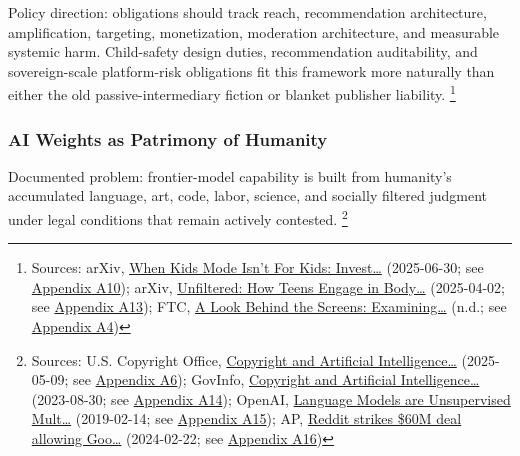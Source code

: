 \documentclass[
  american,
  11pt,
  letterpaper,
]{article}
\begin{document}
Policy direction: obligations should track reach, recommendation
architecture, amplification, targeting, monetization, moderation
architecture, and measurable systemic harm. Child-safety design duties,
recommendation auditability, and sovereign-scale platform-risk
obligations fit this framework more naturally than either the old
passive-intermediary fiction or blanket publisher liability. \footnote{Sources:
  arXiv, \href{https://arxiv.org/abs/2507.00299}{When Kids Mode Isn't
  For Kids: Invest\ldots{}} (2025-06-30; see
  \hyperref[ch-10-appendix-a10-when-kids-mode-isn-t-for-kids-investigating-tiktok-s-under-13-experience]{Appendix
  A10}); arXiv, \href{https://arxiv.org/abs/2504.02176}{Unfiltered: How
  Teens Engage in Body\ldots{}} (2025-04-02; see
  \hyperref[ch-10-appendix-a13-unfiltered-how-teens-engage-in-body-image-and-shaming-discussions-via-instagram-direct-messages-dms]{Appendix
  A13}); FTC,
  \href{https://www.ftc.gov/reports/look-behind-screens-examining-data-practices-social-media-video-streaming-services}{A
  Look Behind the Screens: Examining\ldots{}} (n.d.; see
  \hyperref[ch-10-appendix-a4-a-look-behind-the-screens-examining-the-data-practices-of-social-media-and-video-streaming-services]{Appendix
  A4})}

\subsubsection{AI Weights as Patrimony of
Humanity}\label{ai-weights-as-patrimony-of-humanity}

Documented problem: frontier-model capability is built from humanity's
accumulated language, art, code, labor, science, and socially filtered
judgment under legal conditions that remain actively contested.
\footnote{Sources: U.S. Copyright Office,
  \href{https://copyright.gov/ai/Copyright-and-Artificial-Intelligence-Part-3-Generative-AI-Training-Report-Pre-Publication-Version.pdf}{Copyright
  and Artificial Intelligence\ldots{}} (2025-05-09; see
  \hyperref[ch-10-appendix-a6-copyright-and-artificial-intelligence-part-3-generative-ai-training-pre-publication-version]{Appendix
  A6}); GovInfo,
  \href{https://www.govinfo.gov/content/pkg/FR-2023-08-30/pdf/2023-18624.pdf}{Copyright
  and Artificial Intelligence\ldots{}} (2023-08-30; see
  \hyperref[ch-10-appendix-a14-copyright-and-artificial-intelligence-notice-of-inquiry]{Appendix
  A14}); OpenAI,
  \href{https://cdn.openai.com/better-language-models/language_models_are_unsupervised_multitask_learners.pdf}{Language
  Models are Unsupervised Mult\ldots{}} (2019-02-14; see
  \hyperref[ch-10-appendix-a15-language-models-are-unsupervised-multitask-learners]{Appendix
  A15}); AP,
  \href{https://apnews.com/article/a7f131c7cb4225307134ef21d3c6a708}{Reddit
  strikes \$60M deal allowing Goo\ldots{}} (2024-02-22; see
  \hyperref[ch-10-appendix-a16-reddit-strikes-60m-deal-allowing-google-to-train-ai-models-on-its-posts-unveils-ipo-plans]{Appendix
  A16})}
\end{document}
